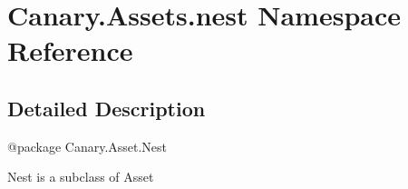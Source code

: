 \hypertarget{namespace_canary_1_1_assets_1_1nest}{\section{Canary.\-Assets.\-nest Namespace Reference}
\label{namespace_canary_1_1_assets_1_1nest}
}


\subsection{Detailed Description}
\begin{DoxyVerb}@package Canary.Asset.Nest

Nest is a subclass of Asset
\end{DoxyVerb}
 